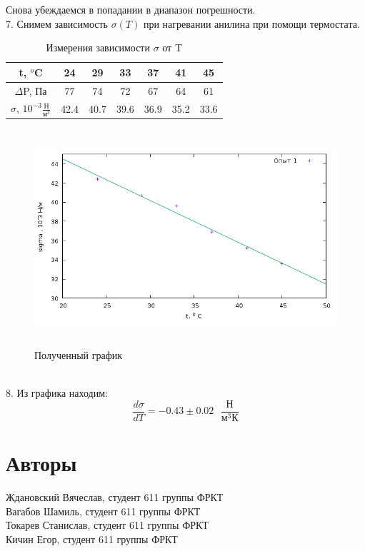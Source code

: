 \documentclass[a4paper]{article}
\begin{document}
	Снова убеждаемся в попадании в диапазон погрешности. \\
	7. Снимем зависимость $\sigma (T)$ при нагревании анилина при помощи термостата. \\
	\begin{table}[h!]
 		\centering
	\begin{tabular}{|c|c|c|c|c|c|c|}
	\hline
t, $^o$C & 24 & 29 & 33 & 37 & 41 & 45 \\
\hline
$\Delta$P, Па& 77&	74&	72&	67&	64&	61	\\
\hline
$\sigma$, $10^{-3} \frac{\text{Н}}{\text{м}^3}$ & 42.4 & 40.7 &	39.6& 36.9 & 35.2 & 33.6 \\
\hline
    	\end{tabular}
  		\caption{Измерения зависимости $\sigma$ от T}
	\end{table}
	\begin{figure}[ht!]
		\centering
		\includegraphics[height=80mm]{pic2.png}
		\caption{Полученный график \label{overflow}}
	\end{figure}
	\\8. Из графика находим:
	\begin{equation}
	\frac{d\sigma}{dT}=-0.43 \pm 0.02 \text{ }\frac{\text{Н}}{\text{м}^3\text{К}}
	\end{equation}
	\section{Авторы} Ждановский Вячеслав, студент 611 группы ФРКТ\\
Вагабов Шамиль, студент 611 группы ФРКТ\\
Токарев Станислав, студент 611 группы ФРКТ\\
Кичин Егор, студент 611 группы ФРКТ
\end{document}
